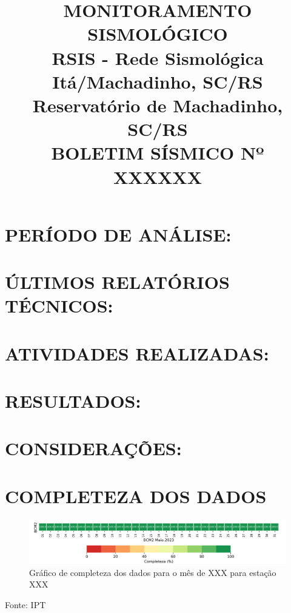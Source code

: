 \documentclass{article}
\begin{document}
\thispagestyle{plain} %
\title{\textbf{MONITORAMENTO SISMOLÓGICO} \\
\textbf{RSIS - Rede Sismológica Itá/Machadinho, SC/RS} \\
\textbf{Reservatório de Machadinho, SC/RS} \\
\textbf{BOLETIM SÍSMICO Nº XXXXXX}}
\maketitle

\section{PERÍODO DE ANÁLISE:}

\section{ÚLTIMOS RELATÓRIOS TÉCNICOS:}

\section{ATIVIDADES REALIZADAS:}

\section{RESULTADOS:}

\section{CONSIDERAÇÕES:}

\newpage
\titleformat{\section}[hang]{\bfseries\Large}{\thesection}{1em}{} %
\section{COMPLETEZA DOS DADOS}
\begin{figure}[h]
    \centering
    \caption{Gráfico de completeza dos dados para o mês de XXX para estação XXX}
    \includegraphics[width=1.2\textwidth]{completeza_dos_dados.png} %
\end{figure}
Fonte: IPT
\end{document}

